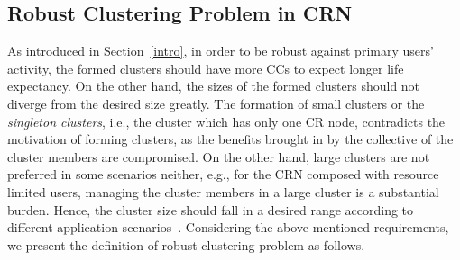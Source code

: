 \documentclass[10pt,journal,compsoc]{IEEEtran}
\theoremstyle{mytheoremstyle}
\theoremstyle{mytheoremstyle}
\theoremstyle{mytheoremstyle}
\newcommand{\eg}{e.g., }
\newcommand{\ie}{i.e., }
\begin{document}
\subsection{Robust Clustering Problem in CRN}
\label{problem}

As introduced in Section~\ref{intro}, in order to be robust against primary users' activity, the formed clusters should have more CCs to expect longer life expectancy.
On the other hand, the sizes of the formed clusters should not diverge from the desired size greatly.
The formation of small clusters or the \textit{singleton clusters}, \ie the cluster which has only one CR node, contradicts the motivation of forming clusters, as the benefits brought in by the collective of the cluster members are compromised.
On the other hand, large clusters are not preferred in some scenarios neither, \eg for the CRN composed with resource limited users, managing the cluster members in a large cluster is a substantial burden. 
Hence, the cluster size should fall in a desired range according to different application scenarios~\cite{Chen04clusteringalgorithms, capacity_cluster_06}.
Considering the above mentioned requirements, we present the definition of robust clustering problem as follows.
\end{document}

